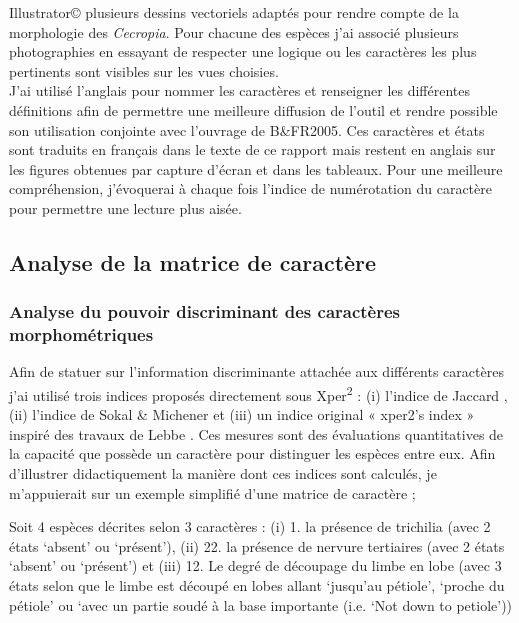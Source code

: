 \documentclass[a4paper]{article}
\theoremstyle{definition}
\theoremstyle{definition}
\theoremstyle{definition}
\theoremstyle{remark}
\begin{document}
Illustrator© plusieurs dessins vectoriels adaptés pour rendre compte de
la morphologie des \emph{Cecropia}. Pour chacune des espèces j'ai
associé plusieurs photographies en essayant de respecter une logique ou
les caractères les plus pertinents sont visibles sur les vues
choisies.\\
J'ai utilisé l'anglais pour nommer les caractères et renseigner les
différentes définitions afin de permettre une meilleure diffusion de
l'outil et rendre possible son utilisation conjointe avec l'ouvrage de
B\&FR2005. Ces caractères et états sont traduits en français dans le
texte de ce rapport mais restent en anglais sur les figures obtenues par
capture d'écran et dans les tableaux. Pour une meilleure compréhension,
j'évoquerai à chaque fois l'indice de numérotation du caractère pour
permettre une lecture plus aisée.

\subsection{Analyse de la matrice de
caractère}\label{analyse-de-la-matrice-de-caractere}

\subsubsection{Analyse du pouvoir discriminant des caractères
morphométriques}\label{analyse-du-pouvoir-discriminant-des-caracteres-morphometriques}

Afin de statuer sur l'information discriminante attachée aux différents
caractères j'ai utilisé trois indices proposés directement sous
Xper\textsuperscript{2} : (i) l'indice de Jaccard
\citeyearpar{Jaccard1901}, (ii) l'indice de Sokal \& Michener
\citeyearpar{Sokal1958} et (iii) un indice original « xper2's index »
inspiré des travaux de Lebbe \citeyearpar{Lebbe1991}. Ces mesures sont
des évaluations quantitatives de la capacité que possède un caractère
pour distinguer les espèces entre eux. Afin d'illustrer didactiquement
la manière dont ces indices sont calculés, je m'appuierait sur un
exemple simplifié d'une matrice de caractère ;

Soit 4 espèces décrites selon 3 caractères : (i) 1. la présence de
trichilia (avec 2 états `absent' ou `présent'), (ii) 22. la présence de
nervure tertiaires (avec 2 états `absent' ou `présent') et (iii) 12. Le
degré de découpage du limbe en lobe (avec 3 états selon que le limbe est
découpé en lobes allant `jusqu'au pétiole', `proche du pétiole' ou `avec
un partie soudé à la base importante (i.e. `Not down to petiole'))
\end{document}
